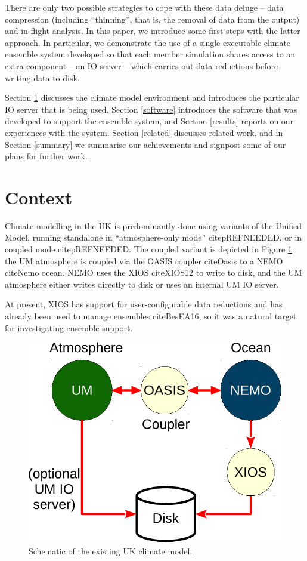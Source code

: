 \documentclass[twocolumn, 12pt]{paper}
\begin{document}
There are only two possible strategies to cope with these data deluge -- data compression (including ``thinning'', that is, the removal of data from the output) and in-flight analysis.
In this paper, we introduce some first steps with the latter approach.
In particular, we demonstrate the use of a single executable climate ensemble system developed so that each member simulation shares access to an extra component -- an IO server -- which carries out data reductions before writing data to disk.

Section \ref{context} discusses the climate model environment and introduces the particular IO server that is being used.
Section \ref{software} introduces the software that was developed to support the ensemble system, and Section \ref{results} reports on our experiences with the system.
Section \ref{related} discusses related work, and in Section \ref{summary} we summarise our achievements and signpost some of our plans for further work.


\section{Context}
\label{context}

Climate modelling in the UK is predominantly done using variants of the Unified Model, running standalone in ``atmosphere-only mode'' citep{REFNEEDED}, or in coupled mode citep{REFNEEDED}.
The coupled variant is depicted in Figure \ref{coupled}: the UM atmosphere is coupled via the OASIS coupler cite{Oasis} to a NEMO cite{Nemo} ocean.
NEMO uses the XIOS cite{XIOS12} to write to disk, and the UM atmosphere either writes directly to disk or uses an internal UM IO server.

At present, XIOS has support for user-configurable data reductions and has already been used to manage ensembles cite{BesEA16}, so it was a natural target for investigating ensemble support.


\begin{figure}[H]
	\centerline{
		\includegraphics[scale=0.5]{figures/xios_figures_a.pdf}
	}
	\caption{Schematic of the existing UK climate model.}
	\label{coupled}
\end{figure}
\end{document}
